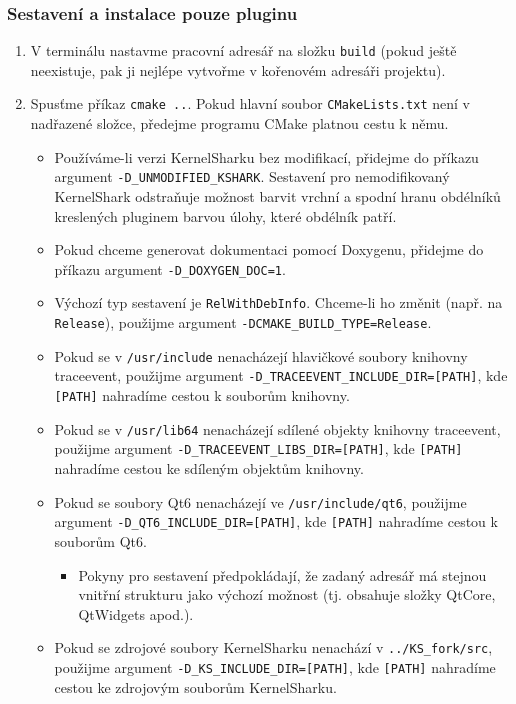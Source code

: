 \subsubsection{Sestavení a instalace pouze pluginu}
\begin{enumerate}
  \item V terminálu nastavme pracovní adresář na složku \texttt{build} (pokud ještě neexistuje, pak ji nejlépe vytvořme v kořenovém adresáři projektu).
  \item Spusťme příkaz \texttt{cmake ..}. Pokud hlavní soubor \texttt{CMakeLists.txt} není v nadřazené složce, předejme programu CMake platnou cestu k němu.
    \begin{itemize}
      \item Používáme-li verzi KernelSharku bez modifikací, přidejme do příkazu argument \texttt{-D\_UNMODIFIED\_KSHARK}.
      Sestavení pro nemodifikovaný KernelShark odstraňuje možnost barvit vrchní a spodní hranu obdélníků kreslených pluginem barvou úlohy, které obdélník patří.
      \item Pokud chceme generovat dokumentaci pomocí Doxygenu, přidejme do příkazu argument \texttt{-D\_DOXYGEN\_DOC=1}.
      \item Výchozí typ sestavení je \texttt{RelWithDebInfo}. Chceme-li ho změnit (např. na \texttt{Release}), použijme argument \texttt{-DCMAKE\_BUILD\_TYPE=Release}.
      \item Pokud se v \texttt{/usr/include} nenacházejí hlavičkové soubory knihovny traceevent, použijme argument \texttt{-D\_TRACEEVENT\_INCLUDE\_DIR=[PATH]}, kde \texttt{[PATH]} nahradíme cestou k souborům knihovny.
      \item Pokud se v \texttt{/usr/lib64} nenacházejí sdílené objekty knihovny traceevent, použijme argument \texttt{-D\_TRACEEVENT\_LIBS\_DIR=[PATH]}, kde \texttt{[PATH]} nahradíme cestou ke sdíleným objektům knihovny.
      \item Pokud se soubory Qt6 nenacházejí ve \texttt{/usr/include/qt6}, použijme argument \texttt{-D\_QT6\_INCLUDE\_DIR=[PATH]}, kde \texttt{[PATH]} nahradíme cestou k souborům Qt6.
        \begin{itemize}
          \item Pokyny pro sestavení předpokládají, že zadaný adresář má stejnou vnitřní strukturu jako výchozí možnost (tj. obsahuje složky QtCore, QtWidgets apod.).
        \end{itemize}
      \item Pokud se zdrojové soubory KernelSharku nenachází v \texttt{../KS\_fork/src}, použijme argument \texttt{-D\_KS\_INCLUDE\_DIR=[PATH]}, kde \texttt{[PATH]} nahradíme cestou ke zdrojovým souborům KernelSharku.

\end{itemize}
\end{enumerate}
